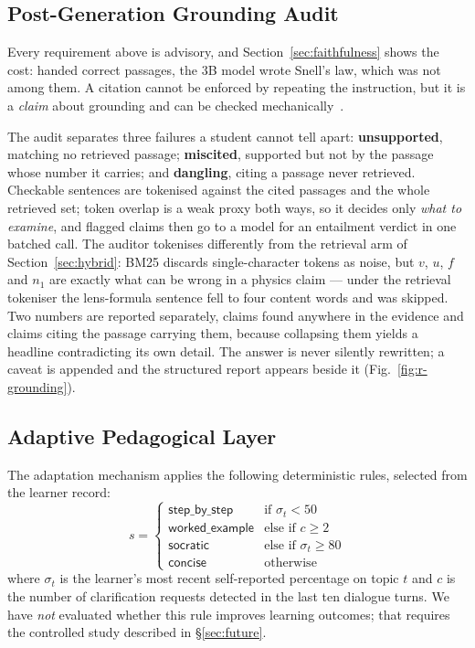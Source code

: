 \documentclass[conference]{IEEEtran}
\begin{document}
\subsection{Post-Generation Grounding Audit}
\label{sec:audit}
Every requirement above is advisory, and Section~\ref{sec:faithfulness} shows
the cost: handed correct passages, the $3$B model wrote Snell's law, which was
not among them. A citation cannot be enforced by repeating the instruction, but
it is a \emph{claim} about grounding and can be checked
mechanically~\cite{manakul2023,gao2023}.

The audit separates three failures a student cannot tell apart:
\textbf{unsupported}, matching no retrieved passage; \textbf{miscited},
supported but not by the passage whose number it carries; and
\textbf{dangling}, citing a passage never retrieved. Checkable sentences are
tokenised against the cited passages and the whole retrieved set; token overlap
is a weak proxy both ways, so it decides only \emph{what to examine}, and
flagged claims then go to a model for an entailment verdict in one batched call.
The auditor tokenises differently from the retrieval arm of
Section~\ref{sec:hybrid}: BM25 discards single-character tokens as noise, but
$v$, $u$, $f$ and $n_1$ are exactly what can be wrong in a physics claim ---
under the retrieval tokeniser the lens-formula sentence fell to four content
words and was skipped. Two numbers are reported separately, claims found
anywhere in the evidence and claims citing the passage carrying them, because
collapsing them yields a headline contradicting its own detail. The answer is
never silently rewritten; a caveat is appended and the structured report appears
beside it (Fig.~\ref{fig:r-grounding}).

\subsection{Adaptive Pedagogical Layer}
\label{sec:adaptive}
The adaptation mechanism applies the following deterministic rules, selected
from the learner record:
\begin{equation}
s =
\begin{cases}
\textsf{step\_by\_step} & \text{if } \sigma_t < 50\\
\textsf{worked\_example} & \text{else if } c \geq 2\\
\textsf{socratic} & \text{else if } \sigma_t \geq 80\\
\textsf{concise} & \text{otherwise}
\end{cases}
\end{equation}
where $\sigma_t$ is the learner's most recent self-reported percentage on topic
$t$ and $c$ is the number of clarification requests detected in the last ten
dialogue turns. We have \emph{not} evaluated whether this rule improves learning
outcomes; that requires the controlled study described in §\ref{sec:future}.
\end{document}
